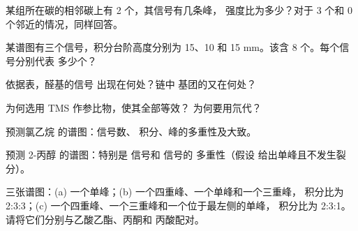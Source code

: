 \begin{exercise}[$\star$]\label{exo:g12:proton-nmr:2}
某组所在碳的相邻碳上有 2 个，其信号有几条峰，
强度比为多少？对于 3 个和
0 个邻近的情况，同样回答。
\end{exercise}

\begin{exercise}[$\star$]\label{exo:g12:proton-nmr:3}
某谱图有三个信号，积分台阶高度分别为 15、10 和
15 mm。该含 8 个。每个信号分别代表
多少个？
\end{exercise}

\begin{exercise}[$\star$]\label{exo:g12:proton-nmr:4}
依据表，醛基的信号
出现在何处？链中  基团的又在何处？
\end{exercise}

\begin{exercise}[$\star$]\label{exo:g12:proton-nmr:5}
为何选用 TMS 作参比物，使其全部等效？
为何要用氘代？
\end{exercise}

\begin{exercise}[$\star\star$]\label{exo:g12:proton-nmr:6}
预测氯乙烷  的谱图：信号数、
积分、峰的多重性及大致。
\end{exercise}

\begin{exercise}[$\star\star$]\label{exo:g12:proton-nmr:7}
预测 2-丙醇  的谱图：特别是  信号和  信号的
多重性（假设
 给出单峰且不发生裂分）。
\end{exercise}

\begin{exercise}[$\star\star$]\label{exo:g12:proton-nmr:8}
三张谱图：(a) 一个单峰；(b) 一个四重峰、一个单峰和一个三重峰，
积分比为 2:3:3；(c) 一个四重峰、一个三重峰和一个位于最左侧的单峰，
积分比为 2:3:1。请将它们分别与乙酸乙酯、丙酮和
丙酸配对。
\end{exercise}

